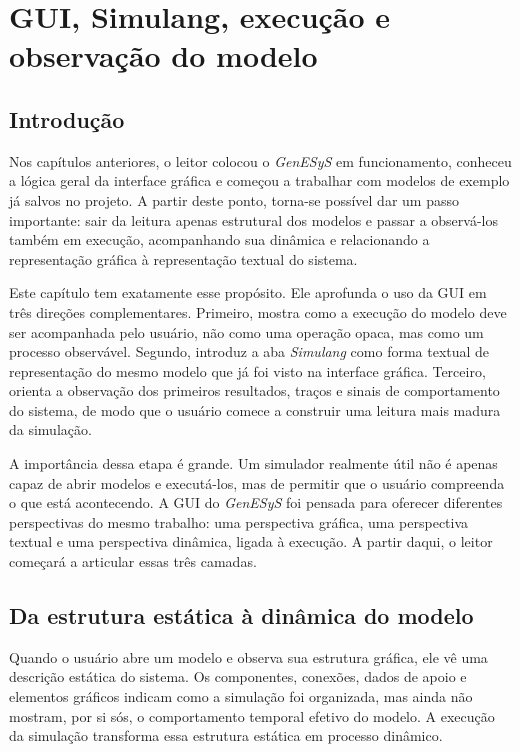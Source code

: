 \chapter{GUI, Simulang, execução e observação do modelo}
\label{chap:gui_simulang_execucao_observacao}

\section{Introdução}
\label{sec:cap5_introducao}

Nos capítulos anteriores, o leitor colocou o \textit{GenESyS} em funcionamento, conheceu a lógica geral da interface gráfica e começou a trabalhar com modelos de exemplo já salvos no projeto. A partir deste ponto, torna-se possível dar um passo importante: sair da leitura apenas estrutural dos modelos e passar a observá-los também em execução, acompanhando sua dinâmica e relacionando a representação gráfica à representação textual do sistema.

Este capítulo tem exatamente esse propósito. Ele aprofunda o uso da GUI em três direções complementares. Primeiro, mostra como a execução do modelo deve ser acompanhada pelo usuário, não como uma operação opaca, mas como um processo observável. Segundo, introduz a aba \textit{Simulang} como forma textual de representação do mesmo modelo que já foi visto na interface gráfica. Terceiro, orienta a observação dos primeiros resultados, traços e sinais de comportamento do sistema, de modo que o usuário comece a construir uma leitura mais madura da simulação.

A importância dessa etapa é grande. Um simulador realmente útil não é apenas capaz de abrir modelos e executá-los, mas de permitir que o usuário compreenda o que está acontecendo. A GUI do \textit{GenESyS} foi pensada para oferecer diferentes perspectivas do mesmo trabalho: uma perspectiva gráfica, uma perspectiva textual e uma perspectiva dinâmica, ligada à execução. A partir daqui, o leitor começará a articular essas três camadas.

\section{Da estrutura estática à dinâmica do modelo}
\label{sec:cap5_estrutura_estatica_dinamica}

Quando o usuário abre um modelo e observa sua estrutura gráfica, ele vê uma descrição estática do sistema. Os componentes, conexões, dados de apoio e elementos gráficos indicam como a simulação foi organizada, mas ainda não mostram, por si sós, o comportamento temporal efetivo do modelo. A execução da simulação transforma essa estrutura estática em processo dinâmico.


